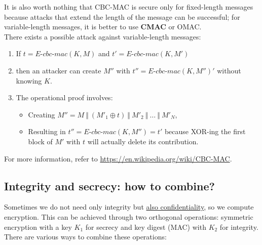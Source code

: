 It is also worth nothing that CBC-MAC is secure only for fixed-length messages because attacks that extend the length of the message can be successful; for variable-length messages, it is better to use \textbf{CMAC} or OMAC.\\
There exists a possible attack against variable-length messages:
\begin{enumerate}
	\item If $t = \textit{E-cbc-mac}(K, M)$ and $t' = \textit{E-cbc-mac}(K, M')$
	\item then an attacker can create $M''$ with $t'' = \textit{E-cbc-mac}(K, M'')'$ without knowing $K$.
	\item The operational proof involves:
	      \begin{itemize}
		      \item Creating $M'' = M \ \Vert \ (M'_1 \oplus t) \ \Vert \ M'_2 \ \Vert \ \ldots \ \Vert \ M'_N$,
		      \item Resulting in $t'' = \textit{E-cbc-mac}(K, M'') = t'$ because XOR-ing the first block of $M'$ with $t$ will actually delete its contribution.
	      \end{itemize}
\end{enumerate}
For more information, refer to \url{https://en.wikipedia.org/wiki/CBC-MAC}.


\subsection{Integrity and secrecy: how to combine?}
Sometimes we do not need only integrity but \underline{also confidentiality}, so we compute encryption. This can be achieved through two orthogonal operations: symmetric encryption with a key \(K_1\) for secrecy and key digest (MAC) with \(K_2\) for integrity. There are various ways to combine these operations:

